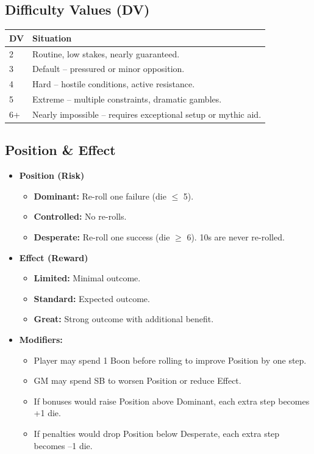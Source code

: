 \subsection{Difficulty Values (DV)}

\begin{tabular}{@{}ll@{}}
\toprule
\textbf{DV} & \textbf{Situation} \\
\midrule
2 & Routine, low stakes, nearly guaranteed. \\
3 & Default -- pressured or minor opposition. \\
4 & Hard -- hostile conditions, active resistance. \\
5 & Extreme -- multiple constraints, dramatic gambles. \\
6+ & Nearly impossible -- requires exceptional setup or mythic aid. \\
\bottomrule
\end{tabular}

\subsection{Position \& Effect}

\begin{itemize}
  \item \textbf{Position (Risk)}
    \begin{itemize}
      \item \textbf{Dominant:} Re-roll one failure (die $\le$ 5).
      \item \textbf{Controlled:} No re-rolls.
      \item \textbf{Desperate:} Re-roll one success (die $\ge$ 6). 10s are never re-rolled.
    \end{itemize}
  \item \textbf{Effect (Reward)}
    \begin{itemize}
      \item \textbf{Limited:} Minimal outcome.
      \item \textbf{Standard:} Expected outcome.
      \item \textbf{Great:} Strong outcome with additional benefit.
    \end{itemize}
  \item \textbf{Modifiers:}
    \begin{itemize}
      \item Player may spend 1 Boon before rolling to improve Position by one step.
      \item GM may spend SB to worsen Position or reduce Effect.
      \item If bonuses would raise Position above Dominant, each extra step becomes +1 die.
      \item If penalties would drop Position below Desperate, each extra step becomes --1 die.
    \end{itemize}
\end{itemize}

